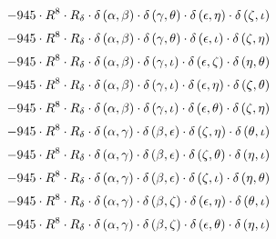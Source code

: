 \begin{subequations}
\begin{gather}
 \\[0.2em] \notag 		 - 945 \cdot R^{8} \cdot R_{\delta{}} \cdot \delta{}\left(\alpha{}, \beta{}\right) \cdot \delta{}\left(\gamma{}, \theta{}\right) \cdot \delta{}\left(\epsilon{}, \eta{}\right) \cdot \delta{}\left(\zeta{}, \iota{}\right) 
 \\[0.2em] \notag 		 - 945 \cdot R^{8} \cdot R_{\delta{}} \cdot \delta{}\left(\alpha{}, \beta{}\right) \cdot \delta{}\left(\gamma{}, \theta{}\right) \cdot \delta{}\left(\epsilon{}, \iota{}\right) \cdot \delta{}\left(\zeta{}, \eta{}\right) 
 \\[0.2em] \notag 		 - 945 \cdot R^{8} \cdot R_{\delta{}} \cdot \delta{}\left(\alpha{}, \beta{}\right) \cdot \delta{}\left(\gamma{}, \iota{}\right) \cdot \delta{}\left(\epsilon{}, \zeta{}\right) \cdot \delta{}\left(\eta{}, \theta{}\right) 
 \\[0.2em] \notag 		 - 945 \cdot R^{8} \cdot R_{\delta{}} \cdot \delta{}\left(\alpha{}, \beta{}\right) \cdot \delta{}\left(\gamma{}, \iota{}\right) \cdot \delta{}\left(\epsilon{}, \eta{}\right) \cdot \delta{}\left(\zeta{}, \theta{}\right) 
 \\[0.2em] \notag 		 - 945 \cdot R^{8} \cdot R_{\delta{}} \cdot \delta{}\left(\alpha{}, \beta{}\right) \cdot \delta{}\left(\gamma{}, \iota{}\right) \cdot \delta{}\left(\epsilon{}, \theta{}\right) \cdot \delta{}\left(\zeta{}, \eta{}\right) 
 \\[0.2em] \notag 		 - 945 \cdot R^{8} \cdot R_{\delta{}} \cdot \delta{}\left(\alpha{}, \gamma{}\right) \cdot \delta{}\left(\beta{}, \epsilon{}\right) \cdot \delta{}\left(\zeta{}, \eta{}\right) \cdot \delta{}\left(\theta{}, \iota{}\right) 
 \\[0.2em] \notag 		 - 945 \cdot R^{8} \cdot R_{\delta{}} \cdot \delta{}\left(\alpha{}, \gamma{}\right) \cdot \delta{}\left(\beta{}, \epsilon{}\right) \cdot \delta{}\left(\zeta{}, \theta{}\right) \cdot \delta{}\left(\eta{}, \iota{}\right) 
 \\[0.2em] \notag 		 - 945 \cdot R^{8} \cdot R_{\delta{}} \cdot \delta{}\left(\alpha{}, \gamma{}\right) \cdot \delta{}\left(\beta{}, \epsilon{}\right) \cdot \delta{}\left(\zeta{}, \iota{}\right) \cdot \delta{}\left(\eta{}, \theta{}\right) 
 \\[0.2em] \notag 		 - 945 \cdot R^{8} \cdot R_{\delta{}} \cdot \delta{}\left(\alpha{}, \gamma{}\right) \cdot \delta{}\left(\beta{}, \zeta{}\right) \cdot \delta{}\left(\epsilon{}, \eta{}\right) \cdot \delta{}\left(\theta{}, \iota{}\right) 
 \\[0.2em] \notag 		 - 945 \cdot R^{8} \cdot R_{\delta{}} \cdot \delta{}\left(\alpha{}, \gamma{}\right) \cdot \delta{}\left(\beta{}, \zeta{}\right) \cdot \delta{}\left(\epsilon{}, \theta{}\right) \cdot \delta{}\left(\eta{}, \iota{}\right) 

\end{gather}
\end{subequations}
